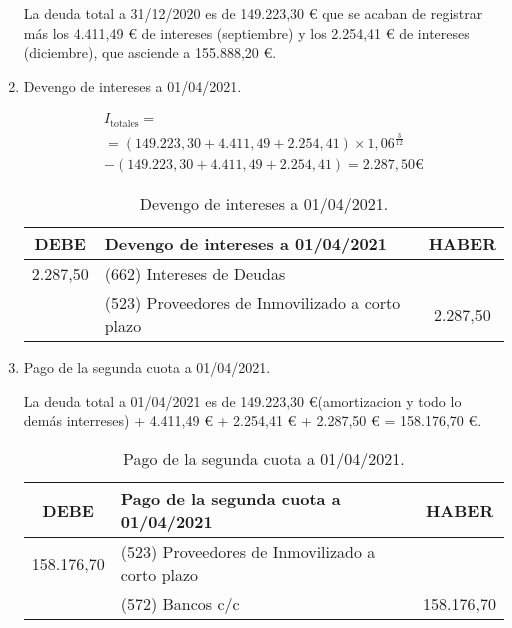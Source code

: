 \begin{enumerate}[label=\alph*)]
    La deuda total  a 31/12/2020 es de 149.223,30 € que se acaban de registrar más los 4.411,49 € de intereses (septiembre) y los 2.254,41 € de intereses (diciembre), que asciende a 155.888,20 €.



    \item Devengo de intereses a 01/04/2021.
    
    \begin{align*}
        I_{\text{totales}} = \\
        = (149.223,30 + 4.411,49 + 2.254,41) \times 1,06^{\frac{3}{12}}\\ - (149.223,30 + 4.411,49 + 2.254,41) = 2.287,50 €
    \end{align*}

    \begin{table}[H]
        \centering
        \begin{tabular}{|c|p{6cm}|c|}
            \hline
            \rowcolor{blue!30}
            \textbf{DEBE} & \textbf{Devengo de intereses a 01/04/2021} & \textbf{HABER} \\
            \hline
            2.287,50 & (662) Intereses de Deudas & \\
            \hline
            & (523) Proveedores de Inmovilizado a corto plazo & 2.287,50 \\
            \hline
        \end{tabular}
        \caption{Devengo de intereses a 01/04/2021.}
        \label{tabla:devengo
        _intereses_abril_2021}
    \end{table}

    \item Pago de la segunda cuota a 01/04/2021.
    
    La deuda total a 01/04/2021 es de 149.223,30 €(amortizacion y todo lo demás interreses) + 4.411,49 € + 2.254,41 € + 2.287,50 € = 158.176,70 €.

    \begin{table}[H]
        \centering
        \begin{tabular}{|c|p{8cm}|c|}
            \hline
            \rowcolor{blue!30}
            \textbf{DEBE} & \textbf{Pago de la segunda cuota a 01/04/2021} & \textbf{HABER} \\
            \hline
            158.176,70 & (523) Proveedores de Inmovilizado a corto plazo & \\
            \hline
            & (572) Bancos c/c & 158.176,70 \\
            \hline
        \end{tabular}
        \caption{Pago de la segunda cuota a 01/04/2021.}
        \label{tabla:pago_segunda_cuota_2021}
    \end{table}

\end{enumerate}


